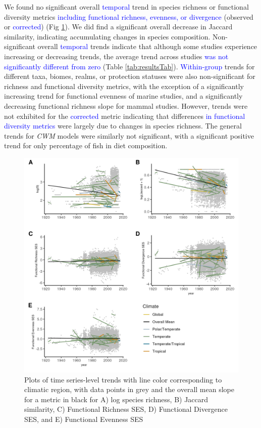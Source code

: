 \documentclass{article}
\begin{document}
We found no significant overall \textcolor{blue}{temporal} trend in
species richness or functional diversity metrics
\textcolor{blue}{including functional richness, evenness, or divergence}
(observed or \textcolor{blue}{corrected}) (Fig
\ref{fig:timeseriesPlot}). We did find a significant overall decrease in
Jaccard similarity, indicating accumulating changes in species
composition. Non-significant overall \textcolor{blue}{temporal} trends
indicate that although some studies experience increasing or decreasing
trends, the average trend across studies
\textcolor{blue}{was not significantly different from zero} (Table
\ref{tab:resultsTab}). \textcolor{blue}{Within-group} trends for
different taxa, biomes, realms, or protection statuses were also
non-significant for richness and functional diversity metrics, with the
exception of a significantly increasing trend for functional evenness of
marine studies, and a significantly decreasing functional richness slope
for mammal studies. However, trends were not exhibited for the
\textcolor{blue}{corrected} metric indicating that differences
\textcolor{blue}{in functional diversity metrics} were largely due to
changes in species richness. The general trends for \emph{CWM} models
were similarly not significant, with a significant positive trend for
only percentage of fish in diet composition.

\begin{figure}
\includegraphics[width=\textwidth]{../../figures/3met_long} \caption{Plots of time series-level trends with line color corresponding to climatic region, with data points in grey and the overall mean slope for a metric in black for A) log species richness, B) Jaccard similarity, C) Functional Richness SES, D) Functional Divergence SES, and E) Functional Evenness SES}\label{fig:timeseriesPlot}
\end{figure}
\end{document}
